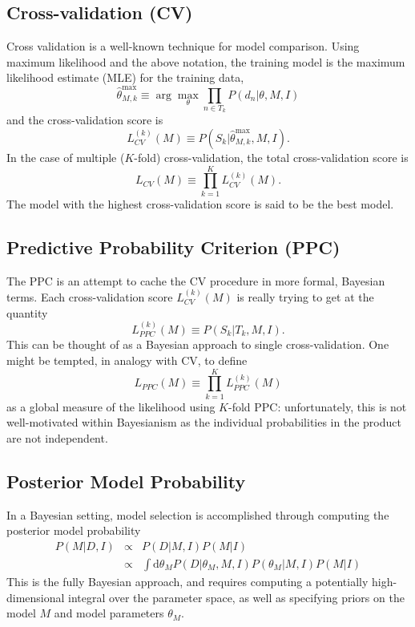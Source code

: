 \documentclass[12pt]{article}
\newcommand{\highlight}[1]{{\color{green} #1}}
\newcommand{\dd}{\mathrm{d}}
\newcommand{\thetamax}[1]{\ensuremath{\hat{\theta}^{\max}_{#1}}}
\newcommand{\LCV}[1]{\ensuremath{L_{CV}}(#1)}
\newcommand{\LCVk}[1]{\ensuremath{L^{(k)}_{CV}}(#1)}
\newcommand{\LPPC}[1]{\ensuremath{L_{PPC}}(#1)}
\newcommand{\LPPCk}[1]{\ensuremath{L^{(k)}_{PPC}}(#1)}
\begin{document}
\subsection{Cross-validation (CV)}
Cross validation is a well-known technique for model comparison.  Using
maximum likelihood and the above notation, the training model is the
maximum likelihood estimate (MLE) for the training data,
\begin{equation}
  \thetamax{M,k} \equiv \arg\max_\theta \prod_{n \in T_k} P(d_n|\theta, M, I)
\end{equation}
and the cross-validation score is
\begin{equation}
  \label{eq:LCVk}
  \LCVk{M} \equiv P(S_k | \thetamax{M,k}, M, I).
\end{equation}
In the case of multiple ($K$-fold) cross-validation, the total
cross-validation score is
\begin{equation}
  \label{eq:LCV}
  \LCV{M} \equiv \prod_{k=1}^K \LCVk{M}.
\end{equation}
The model with the highest cross-validation score is said to be the
best model.

\subsection{\highlight{Predictive Probability Criterion (PPC)}}
The PPC is an attempt to cache the CV procedure in more formal, Bayesian
terms.  Each cross-validation score $L^{(k)}_{CV}(M)$ is really trying to
get at the quantity
\begin{equation}
  \label{eq:LPPCk}
  \LPPCk{M} \equiv P(S_k|T_k, M, I).
\end{equation}
This can be thought of as a Bayesian approach to single cross-validation.
One might be tempted, in analogy with CV, to define
\begin{equation}
  \label{eq:LPPC}
  \LPPC{M} \equiv \prod_{k=1}^K \LPPCk{M}
\end{equation}
as a global measure of the likelihood using $K$-fold PPC:
unfortunately, this is not well-motivated within Bayesianism
as the individual probabilities in the product are not independent.

\subsection{Posterior Model Probability}
In a Bayesian setting, model selection is accomplished through computing
the posterior model probability
\begin{eqnarray}
  P(M|D,I) &\propto& P(D|M,I)P(M|I)\\
           &\propto& \int \dd\theta_M P(D|\theta_M,M,I)P(\theta_M|M,I) P(M|I)
\end{eqnarray}
This is the fully Bayesian approach, and requires computing a potentially
high-dimensional integral over the parameter space, as well as specifying
priors on the model $M$ and model parameters $\theta_M$.
\end{document}
